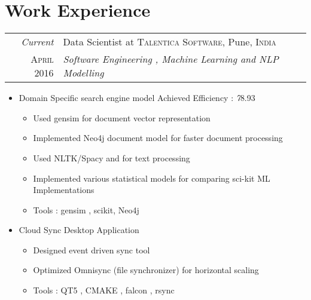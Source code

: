 \documentclass[a4paper,10pt]{article}
\begin{document}
\section{Work Experience}
\begin{tabular}{r|p{13cm}}
 \emph{Current} & Data Scientist at \textsc{Talentica Software}, Pune, \textsc{India} \\\textsc{April 2016}&\emph{Software Engineering , Machine Learning and NLP Modelling}\\
\end{tabular}
\begin{itemize}
\item Domain Specific search engine model \hfill Achieved Efficiency : \emph 78.93%
\begin{itemize}
			\item Used gensim for document vector representation
			\item Implemented Neo4j document model for faster document processing
			\item Used NLTK/Spacy and for text processing
			\item Implemented various statistical models for comparing sci-kit ML Implementations
			\item {Tools : gensim , scikit, Neo4j}
\end{itemize}

\end{itemize}
\begin{itemize}
\item Cloud Sync Desktop Application
\begin{itemize}
			\item Designed event driven sync tool
			\item Optimized Omnisync (file synchronizer) for horizontal scaling 
			\item Tools : QT5 , CMAKE , falcon , rsync
\end{itemize}
\end{itemize}
\end{document}
